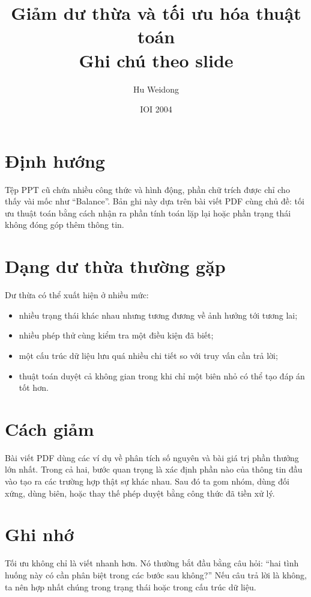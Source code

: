 \documentclass[11pt]{article}
\title{Giảm dư thừa và tối ưu hóa thuật toán\\{\large Ghi chú theo slide}}
\author{Hu Weidong}
\date{IOI 2004}
\begin{document}
\maketitle


\section{Định hướng}

Tệp PPT cũ chứa nhiều công thức và hình động, phần chữ trích được chỉ cho
thấy vài mốc như ``Balance''. Bản ghi này dựa trên bài viết PDF cùng chủ đề:
tối ưu thuật toán bằng cách nhận ra phần tính toán lặp lại hoặc phần trạng
thái không đóng góp thêm thông tin.

\section{Dạng dư thừa thường gặp}

Dư thừa có thể xuất hiện ở nhiều mức:
\begin{itemize}
  \item nhiều trạng thái khác nhau nhưng tương đương về ảnh hưởng tới tương
  lai;
  \item nhiều phép thử cùng kiểm tra một điều kiện đã biết;
  \item một cấu trúc dữ liệu lưu quá nhiều chi tiết so với truy vấn cần trả
  lời;
  \item thuật toán duyệt cả không gian trong khi chỉ một biên nhỏ có thể tạo
  đáp án tốt hơn.
\end{itemize}

\section{Cách giảm}

Bài viết PDF dùng các ví dụ về phân tích số nguyên và bài giá trị phần thưởng
lớn nhất. Trong cả hai, bước quan trọng là xác định phần nào của thông tin
đầu vào tạo ra các trường hợp thật sự khác nhau. Sau đó ta gom nhóm, dùng
đối xứng, dùng biên, hoặc thay thế phép duyệt bằng công thức đã tiền xử lý.

\section{Ghi nhớ}

Tối ưu không chỉ là viết nhanh hơn. Nó thường bắt đầu bằng câu hỏi: ``hai
tình huống này có cần phân biệt trong các bước sau không?'' Nếu câu trả lời
là không, ta nên hợp nhất chúng trong trạng thái hoặc trong cấu trúc dữ liệu.
\end{document}
